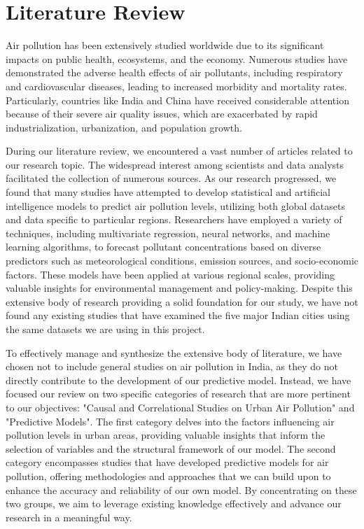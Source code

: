 \documentclass[twoside,11pt]{article}
\begin{document}
\newpage






\section{Literature Review}
Air pollution has been extensively studied worldwide due to its significant impacts on public health, ecosystems, and the economy. Numerous studies have demonstrated the adverse health effects of air pollutants, including respiratory and cardiovascular diseases, leading to increased morbidity and mortality rates. Particularly, countries like India and China have received considerable attention because of their severe air quality issues, which are exacerbated by rapid industrialization, urbanization, and population growth.

During our literature review, we encountered a vast number of articles related to our research topic. The widespread interest among scientists and data analysts facilitated the collection of numerous sources. As our research progressed, we found that many studies have attempted to develop statistical and artificial intelligence models to predict air pollution levels, utilizing both global datasets and data specific to particular regions. Researchers have employed a variety of techniques, including multivariate regression, neural networks, and machine learning algorithms, to forecast pollutant concentrations based on diverse predictors such as meteorological conditions, emission sources, and socio-economic factors. These models have been applied at various regional scales, providing valuable insights for environmental management and policy-making. Despite this extensive body of research providing a solid foundation for our study, we have not found any existing studies that have examined the five major Indian cities using the same datasets we are using in this project.

To effectively manage and synthesize the extensive body of literature, we have chosen not to include general studies on air pollution in India, as they do not directly contribute to the development of our predictive model. Instead, we have focused our review on two specific categories of research that are more pertinent to our objectives: "Causal and Correlational Studies on Urban Air Pollution" and "Predictive Models". The first category delves into the factors influencing air pollution levels in urban areas, providing valuable insights that inform the selection of variables and the structural framework of our model. The second category encompasses studies that have developed predictive models for air pollution, offering methodologies and approaches that we can build upon to enhance the accuracy and reliability of our own model. By concentrating on these two groups, we aim to leverage existing knowledge effectively and advance our research in a meaningful way.
\end{document}
